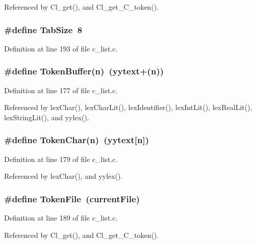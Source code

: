 Referenced by Cl\_\-get(), and Cl\_\-get\_\-C\_\-token().
\subsubsection{\setlength{\rightskip}{0pt plus 5cm}\#define Tab\-Size~8}\label{c__list_8c_41e22bf2e3c2c5781d7546826d8da4b8}




Definition at line 193 of file c\_\-list.c.
\subsubsection{\setlength{\rightskip}{0pt plus 5cm}\#define Token\-Buffer(n)~(\bf{yytext}+(n))}\label{c__list_8c_2f9cc7c02985ba0dcf25cd911343f610}




Definition at line 177 of file c\_\-list.c.

Referenced by lex\-Char(), lex\-Char\-Lit(), lex\-Identifier(), lex\-Int\-Lit(), lex\-Real\-Lit(), lex\-String\-Lit(), and yylex().
\subsubsection{\setlength{\rightskip}{0pt plus 5cm}\#define Token\-Char(n)~(\bf{yytext}[n])}\label{c__list_8c_48efe69a7a599d01fec3cb1e0820fff9}




Definition at line 179 of file c\_\-list.c.

Referenced by lex\-Char(), and yylex().
\subsubsection{\setlength{\rightskip}{0pt plus 5cm}\#define Token\-File~(\bf{current\-File})}\label{c__list_8c_49a700a1de7f03d903e034e5080c9d92}




Definition at line 189 of file c\_\-list.c.

Referenced by Cl\_\-get(), and Cl\_\-get\_\-C\_\-token().

